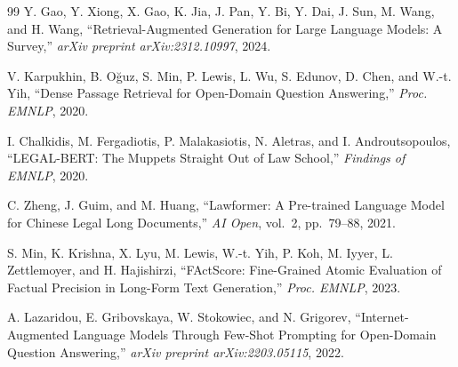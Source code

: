 \documentclass[12pt, a4paper]{article}
\begin{document}
\begin{thebibliography}{99}
Y. Gao, Y. Xiong, X. Gao, K. Jia, J. Pan, Y. Bi, Y. Dai, J. Sun, M. Wang, and H. Wang,
``Retrieval-Augmented Generation for Large Language Models: A Survey,''
\textit{arXiv preprint arXiv:2312.10997}, 2024.

V. Karpukhin, B. O\u{g}uz, S. Min, P. Lewis, L. Wu, S. Edunov,
D. Chen, and W.-t. Yih,
``Dense Passage Retrieval for Open-Domain Question Answering,''
\textit{Proc. EMNLP}, 2020.

I. Chalkidis, M. Fergadiotis, P. Malakasiotis, N. Aletras, and I. Androutsopoulos,
``LEGAL-BERT: The Muppets Straight Out of Law School,''
\textit{Findings of EMNLP}, 2020.

C. Zheng, J. Guim, and M. Huang,
``Lawformer: A Pre-trained Language Model for Chinese Legal Long Documents,''
\textit{AI Open}, vol.~2, pp.~79--88, 2021.

S. Min, K. Krishna, X. Lyu, M. Lewis, W.-t. Yih, P. Koh, M. Iyyer,
L. Zettlemoyer, and H. Hajishirzi,
``FActScore: Fine-Grained Atomic Evaluation of Factual Precision in Long-Form
Text Generation,''
\textit{Proc. EMNLP}, 2023.

A. Lazaridou, E. Gribovskaya, W. Stokowiec, and N. Grigorev,
``Internet-Augmented Language Models Through Few-Shot Prompting for Open-Domain
Question Answering,''
\textit{arXiv preprint arXiv:2203.05115}, 2022.

\end{thebibliography}
\end{document}
